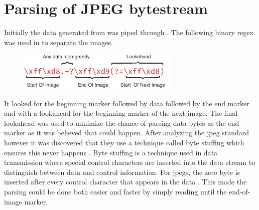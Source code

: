 \section{Parsing of JPEG bytestream}
Initially the data generated from \gs was piped through .
The following binary \gls{regex} was used in to separate the images.
\begin{figure}[H]
    \centering
    \includegraphics[width=0.7\textwidth]{figures/jpeg_regex.pdf}
\end{figure}
It looked for the beginning marker followed by data followed by the end marker and with a lookahead for the beginning marker of the next image.
The final lookahead was used to minimize the chance of parsing data bytes as the end marker as it was believed that could happen.
After analyzing the \gls{jpeg} standard however it was discovered that they use a technique called byte stuffing which ensures this never happens \cite[91]{ccittINFORMATIONTECHNOLOGYDIGITAL1992}.
Byte stuffing is a technique used in data transmission where special control characters are inserted into the data stream to distinguish between data and control information.
For \glspl{jpeg}, the zero byte is inserted after every control character that appears in the data \cite[91]{ccittINFORMATIONTECHNOLOGYDIGITAL1992}.
This made the parsing could be done both easier and faster by simply reading until the end-of-image marker.